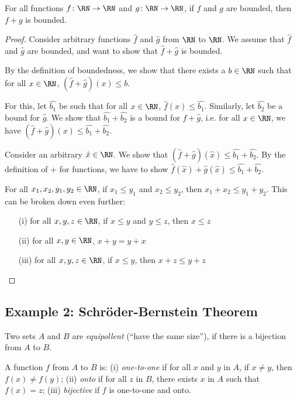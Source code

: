 \begin{theorem}
  For all functions $f\colon  \RN\to \RN$ and $g\colon  \RN\to \RN$, if $f$ and
  $g$ are bounded, then $f+g$ is bounded. 
\end{theorem}
\begin{proof}
Consider arbitrary functions $\hat{f}$ and $\hat{g}$ from $\RN$ to $\RN$.
We assume that $\hat{f}$ and $\hat{g}$ are bounded, and want to 
show that $\hat{f} + \hat{g}$ is bounded.

By the definition of boundedness, we show that there exists a $b \in \RN$ such
that for all $x \in \RN$, $(\hat{f} + \hat{g})(x) \leq b$.

For this, let $\hat{b_1}$ be such that for all $x \in \RN$, $\hat{f}(x) \leq \hat{b_1}$.
Similarly, let $\hat{b_2}$ be a bound for $\hat{g}$.
We show that $\hat{b_1} + \hat{b_2}$ is a bound for $\hat{f} + \hat{g}$, i.e.
for all $x \in \RN$, we have $(\hat{f} + \hat{g})(x) \leq \hat{b_1} + \hat{b_2}$.

Consider an arbitrary $\hat{x} \in \RN$. We show that $(\hat{f} + \hat{g})(\hat{x}) \leq \hat{b_1} + \hat{b_2}$.
By the definition of + for functions, we have to show $\hat{f}(\hat{x}) + \hat{g}(\hat{x}) \leq \hat{b_1} + \hat{b_2}$.

For all $x_1, x_2, y_1, y_2 \in \RN$, if $x_1 \leq y_1$ and $x_2 \leq y_2$, then $x_1 + x_2 \leq y_1 + y_2$. 
This can be broken down even further:

\begin{enumerate}
  \item[(i)] for all $x,y,z \in \RN$, if $x \leq y$ and $y \leq z$, then $x \leq z$
  \item[(ii)] for all $x,y \in \RN$, $x + y = y + x$
  \item[(iii)] for all $x,y,z \in \RN$, if $x \leq y$, then $x + z \leq y + z$
\end{enumerate}
\end{proof}

\subsection{Example 2: Schröder-Bernstein Theorem}

\begin{definition}
  Two sets $A$ and $B$ are \emph{equipollent} (``have the same 
  size''), if there is a bijection from $A$ to $B$.
\end{definition}

\begin{definition}
  A function $f$ from $A$ to $B$ is: 
  (i) \emph{one-to-one} if for all $x$ and $y$ in $A$, if $x \neq y$, then $f(x) \neq f(y)$;
  (ii) \emph{onto} if for all $z$ in $B$, there exists $x$ 
    in $A$ such that $f(x) = z$;
(iii) \emph{bijective} if $f$ is one-to-one and onto.
\end{definition}




